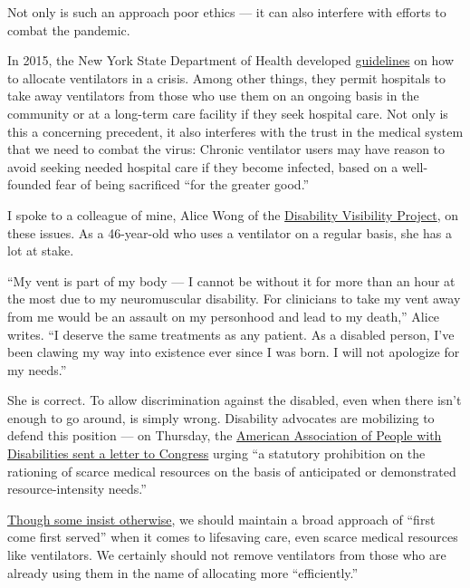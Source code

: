 Not only is such an approach poor ethics --- it can also interfere with
efforts to combat the pandemic.

In 2015, the New York State Department of Health developed
\href{https://www.health.ny.gov/regulations/task_force/reports_publications/docs/ventilator_guidelines.pdf}{guidelines}
on how to allocate ventilators in a crisis. Among other things, they
permit hospitals to take away ventilators from those who use them on an
ongoing basis in the community or at a long-term care facility if they
seek hospital care. Not only is this a concerning precedent, it also
interferes with the trust in the medical system that we need to combat
the virus: Chronic ventilator users may have reason to avoid seeking
needed hospital care if they become infected, based on a well-founded
fear of being sacrificed ``for the greater good.''

I spoke to a colleague of mine, Alice Wong of the
\href{https://disabilityvisibilityproject.com/}{Disability Visibility
Project}, on these issues. As a 46-year-old who uses a ventilator on a
regular basis, she has a lot at stake.

``My vent is part of my body --- I cannot be without it for more than an
hour at the most due to my neuromuscular disability. For clinicians to
take my vent away from me would be an assault on my personhood and lead
to my death,'' Alice writes. ``I deserve the same treatments as any
patient. As a disabled person, I've been clawing my way into existence
ever since I was born. I will not apologize for my needs.''

She is correct. To allow discrimination against the disabled, even when
there isn't enough to go around, is simply wrong. Disability advocates
are mobilizing to defend this position --- on Thursday, the
\href{https://www.aapd.com/wp-content/uploads/2020/03/COVID-19-Response-Package.pdf}{American
Association of People with Disabilities sent a letter to Congress}
urging ``a statutory prohibition on the rationing of scarce medical
resources on the basis of anticipated or demonstrated resource-intensity
needs.''

\href{https://www.nytimes3xbfgragh.onion/2020/03/12/opinion/coronavirus-hospital-shortage.html}{Though
some insist otherwise}, we should maintain a broad approach of ``first
come first served'' when it comes to lifesaving care, even scarce
medical resources like ventilators. We certainly should not remove
ventilators from those who are already using them in the name of
allocating more ``efficiently.''

